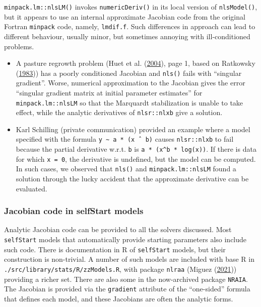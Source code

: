 \documentclass[
]{article}
\begin{document}
\texttt{minpack.lm::nlsLM()} invokes \texttt{numericDeriv()} in its
local version of \texttt{nlsModel()}, but it appears to use an internal
approximate Jacobian code from the original Fortran \texttt{minpack}
code, namely, \texttt{lmdif.f}. Such differences in approach can lead to
different behaviour, usually minor, but sometimes annoying with
ill-conditioned problems.

\begin{itemize}
\item
  A pasture regrowth problem (Huet et al.
  (\protect\hyperlink{ref-Huet2004}{2004}), page 1, based on Ratkowsky
  (\protect\hyperlink{ref-Ratkowsky1983}{1983})) has a poorly
  conditioned Jacobian and \texttt{nls()} fails with ``singular
  gradient''. Worse, numerical approximation to the Jacobian gives the
  error ``singular gradient matrix at initial parameter estimates'' for
  \texttt{minpack.lm::nlsLM} so that the Marquardt stabilization is
  unable to take effect, while the analytic derivatives of
  \texttt{nlsr::nlxb} give a solution.
\item
  Karl Schilling (private communication) provided an example where a
  model specified with the formula
  \texttt{y\ \textasciitilde{}\ a\ *\ (x\ ˆ\ b)} causes
  \texttt{nlsr::nlxb} to fail because the partial derivative w.r.t.
  \texttt{b} is \texttt{a\ *\ (x\^{}b\ *\ log(x))}. If there is data for
  which \texttt{x\ =\ 0}, the derivative is undefined, but the model can
  be computed. In such cases, we observed that \texttt{nls()} and
  \texttt{minpack.lm::nlsLM} found a solution through the lucky accident
  that the approximate derivative can be evaluated.
\end{itemize}

\hypertarget{jacobian-code-in-selfstart-models}{%
\subsubsection{Jacobian code in selfStart
models}\label{jacobian-code-in-selfstart-models}}

Analytic Jacobian code can be provided to all the solvers discussed.
Most \texttt{selfStart} models that automatically provide starting
parameters also include such code. There is documentation in R of
\texttt{selfStart} models, but their construction is non-trivial. A
number of such models are included with base R in
\texttt{./src/library/stats/R/zzModels.R}, with package \texttt{nlraa}
(Miguez (\protect\hyperlink{ref-MiguezNLRAA2021}{2021})) providing a
richer set. There are also some in the now-archived package
\texttt{NRAIA}. The Jacobian is provided via the \texttt{gradient}
attribute of the ``one-sided'' formula that defines each model, and
these Jacobians are often the analytic forms.
\end{document}
